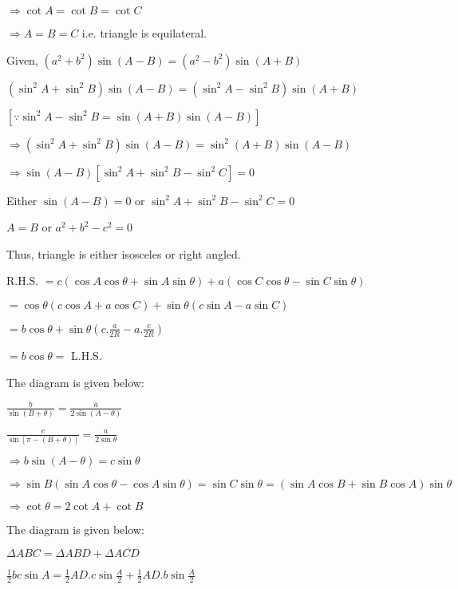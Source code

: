   $\Rightarrow \cot A = \cot B = \cot C$

  $\Rightarrow A = B = C$ i.e. triangle is equilateral.

\item Given, $(a^2 + b^2)\sin(A - B) = (a^2 - b^2)\sin(A + B)$

  $(\sin^2A + \sin^2B)\sin(A - B) = (\sin^2A - \sin^2B)\sin(A + B)$

  $[\because \sin^2A - \sin^2B = \sin(A + B)\sin(A - B)]$

  $\Rightarrow (\sin^2A + \sin^2B)\sin(A - B) = \sin^2(A + B)\sin(A - B)$

  $\Rightarrow \sin(A - B)[\sin^2A + \sin^2B - \sin^2C] = 0$

  Either $\sin(A - B) = 0$ or $\sin^2A + \sin^2B - \sin^2C = 0$

  $A = B$ or $a^2 + b^2 - c^2 = 0$

  Thus, triangle is either isosceles or right angled.

\item R.H.S. $= c(\cos A\cos\theta + \sin A\sin\theta) + a(\cos C\cos\theta - \sin C\sin\theta)$

  $= \cos\theta(c\cos A + a\cos C) + \sin\theta(c\sin A - a\sin C)$

  $=b\cos\theta + \sin\theta\left(c.\frac{a}{2R} - a.\frac{c}{2R}\right)$

  $= b\cos\theta =$ L.H.S.

\item The diagram is given below:

  \startplacefigure
    \externalfigure[18_9.pdf]
  \stopplacefigure

  $\frac{b}{\sin(B + \theta)} = \frac{a}{2\sin(A - \theta)}$

  $\frac{c}{\sin[\pi -(B + \theta)]} = \frac{a}{2\sin\theta}$

  $\Rightarrow b\sin(A - \theta) = c\sin\theta$

  $\Rightarrow \sin B(\sin A\cos\theta - \cos A\sin\theta) = \sin C\sin\theta = (\sin A\cos B + \sin B \cos A)\sin\theta$

  $\Rightarrow \cot\theta = 2\cot A + \cot B$

\item The diagram is given below:

  \startplacefigure
    \externalfigure[18_10.pdf]
  \stopplacefigure

  $\Delta ABC = \Delta ABD + \Delta ACD$

  $\frac{1}{2}bc\sin A = \frac{1}{2}AD.c\sin\frac{A}{2} + \frac{1}{2}AD.b\sin\frac{A}{2}$

